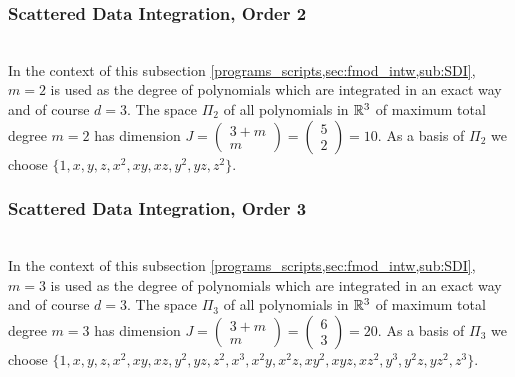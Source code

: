 \subsubsection{Scattered Data Integration, Order 2}
%
\\
In the context of this subsection \ref{programs_scripts,sec:fmod_intw,sub:SDI}, $m=2$ is used as the 
degree of polynomials which are integrated in an exact way and of course $d=3$. The space $\Pi_2$ of all polynomials in 
$\mathbb{R}^3$ of maximum total degree $m=2$ has dimension $J = \left(\begin{array}{c} 3+m \\ m \end{array}\right) 
= \left(\begin{array}{c} 5 \\ 2 \end{array}\right) = 10$. As a basis of $\Pi_2$ we choose $\big\{1,
\allowbreak x,\allowbreak y,\allowbreak z,\allowbreak x^2,\allowbreak xy,\allowbreak xz,\allowbreak y^2,
\allowbreak yz,\allowbreak  z^2\big\}$.
%
\subsubsection{Scattered Data Integration, Order 3}
%
\\
In the context of this subsection \ref{programs_scripts,sec:fmod_intw,sub:SDI}, $m=3$ is used as the 
degree of polynomials which are integrated in an exact way and of course $d=3$. The space $\Pi_3$ of all polynomials in 
$\mathbb{R}^3$ of maximum total degree $m=3$ has dimension $J = \left(\begin{array}{c} 3+m \\ m \end{array}\right) 
= \left(\begin{array}{c} 6 \\ 3 \end{array}\right) = 20$. As a basis of $\Pi_3$ we choose $\big\{1,
\allowbreak x,\allowbreak y,\allowbreak z,\allowbreak x^2,\allowbreak xy,\allowbreak xz,\allowbreak y^2,
\allowbreak yz,\allowbreak  z^2,\allowbreak x^3,\allowbreak  x^2y,\allowbreak  x^2z,\allowbreak  xy^2,
\allowbreak  xyz,\allowbreak  xz^2,\allowbreak  y^3,\allowbreak  y^2z,\allowbreak  yz^2,\allowbreak  
z^3\big\}$.
%

